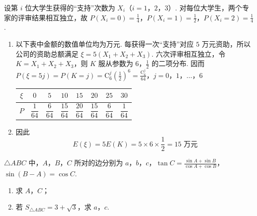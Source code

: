 \begin{solution}
设第 \(i\) 位大学生获得的“支持”次数为 \(X_{i}\)（\(i=1\)，\(2\)，\(3\)）. 对每位大学生，两个专家的评审结果相互独立，故 \(P(X_{i}=0)=\frac14\)，\(P(X_{i}=1)=\frac12\)，\(P(X_{i}=2)=\frac14\).

\begin{enumerate}
\item
以下表中金额的数值单位均为万元. 每获得一次“支持”对应 \(5\) 万元资助，所以公司的资助总额满足 \(\xi=5(X_{1}+X_{2}+X_{3})\). 六次评审相互独立，令 \(K=X_{1}+X_{2}+X_{3}\)，则 \(K\) 服从参数为 \(6\)，\(\frac12\) 的二项分布. 因而
\(P(\xi=5j)=P(K=j)=\mathrm C_{6}^{j}\left(\frac12\right)^{6}=\frac{\mathrm C_{6}^{j}}{64}\)，\(j=0\)，\(1\)，\(\ldots\)，\(6\)
\begin{center}
\begin{tabular}{c|ccccccc}
\(\xi\) & \(0\) & \(5\) & \(10\) & \(15\) & \(20\) & \(25\) & \(30\) \\
\hline
\(P\) & \(\dfrac{1}{64}\) & \(\dfrac{6}{64}\) & \(\dfrac{15}{64}\) & \(\dfrac{20}{64}\) & \(\dfrac{15}{64}\) & \(\dfrac{6}{64}\) & \(\dfrac{1}{64}\)
\end{tabular}
\end{center}

\item
因此
\[
E(\xi)=5E(K)=5\times6\times\frac12=15\text{ 万元}
\]
\end{enumerate}
\end{solution}

\begin{problem}
\(\triangle ABC\) 中，\(A\)，\(B\)，\(C\) 所对的边分别为 \(a\)，\(b\)，\(c\)，\(\tan C = \frac{\sin A + \sin B}{\cos A + \cos B}\)，\(\sin(B - A) = \cos C\).

\begin{enumerate}
\item 求 \(A\)，\(C\)；
\item 若 \(S_{\triangle ABC} = 3 + \sqrt{3}\)，求 \(a\)，\(c\).
\end{enumerate}
\end{problem}

